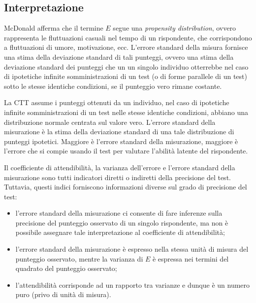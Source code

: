 \subsection{Interpretazione}

McDonald afferma che il termine $E$ segue una \emph{propensity distribution}, ovvero
rappresenta le fluttuazioni casuali nel tempo di un rispondente, che corrispondono a
fluttuazioni di umore, motivazione, ecc. L'errore standard della misura fornisce una stima della deviazione standard di tali punteggi, ovvero una stima della deviazione standard dei punteggi che un un singolo individuo otterrebbe nel caso di ipotetiche infinite somministrazioni di un test (o di forme parallele di un test) sotto le stesse identiche condizioni, se il punteggio vero rimane costante. 

La CTT assume i punteggi ottenuti da un individuo, nel caso di ipotetiche infinite somministrazioni di un test nelle stesse identiche condizioni, abbiano una distribuzione normale centrata sul valore vero. L'errore standard della misurazione è la stima della deviazione standard di una tale distribuzione di punteggi ipotetici.
 Maggiore è l'errore standard della misurazione, maggiore è l'errore che si compie usando il test per valutare l'abilità latente del rispondente.

Il coefficiente di attendibilità, la varianza dell'errore e l'errore standard della misurazione sono tutti indicatori diretti o indiretti della precisione del test. Tuttavia, questi indici forniscono informazioni diverse sul grado di precisione del test:
\begin{itemize}
\item
 l'errore standard della misurazione ci consente di fare inferenze sulla precisione del punteggio osservato di un singolo rispondente, ma non è possibile assegnare tale interpretazione al coefficiente di attendibilità;
\item
 l'errore standard della misurazione è espresso nella stessa unità di misura del punteggio osservato, mentre la varianza di $E$ è espressa nei termini del quadrato del punteggio osservato;
 \item
 l'attendibilità corrisponde ad un rapporto  tra varianze e dunque è un numero puro (privo di unità di misura). 
 \end{itemize}


